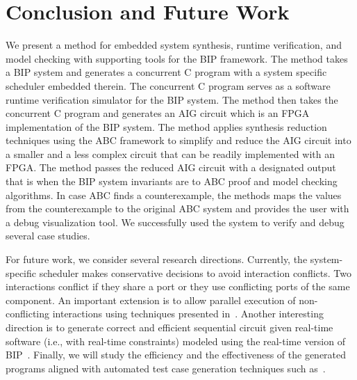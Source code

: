 \section{Conclusion and Future Work}
\label{sec:conclusion}
%
We present a method for embedded system synthesis, runtime verification,
and model checking with supporting tools for the BIP framework. 
The method takes a BIP system and generates a concurrent C program with a system 
specific scheduler embedded therein. 
The concurrent C program serves as a software runtime verification simulator for the 
BIP system.
The method then takes the concurrent C program and generates an AIG circuit which is an
FPGA implementation of the BIP system. 
The method applies synthesis reduction techniques using the ABC framework 
to simplify and reduce the AIG circuit
into a smaller and a less complex circuit that can be readily implemented with an 
FPGA. 
The method passes the reduced AIG circuit with a designated output that is \true
when the BIP system invariants are \true to ABC proof and model checking 
algorithms. In case ABC finds a counterexample, the methods maps the values from 
the counterexample to the original ABC system and provides the user with a debug
visualization tool. 
We successfully used the system to verify and debug several case studies. 


For future work, we consider several research directions.
% 
Currently, the system-specific scheduler makes conservative decisions to avoid interaction conflicts. Two interactions conflict if they share a port or they use conflicting ports of the same component.
An important extension is to allow parallel execution of non-conflicting interactions using techniques presented in~\cite{BonakdarpourBJQS12}. Another interesting direction is to generate correct and efficient sequential circuit given real-time software (i.e., with real-time constraints) modeled using the real-time version of BIP~\cite{AbdellatifCS13}. 
%
Finally, we will study the efficiency and the effectiveness of the generated \caig programs aligned with automated test case generation techniques such as~\cite{kbse-BurnimS08}.
